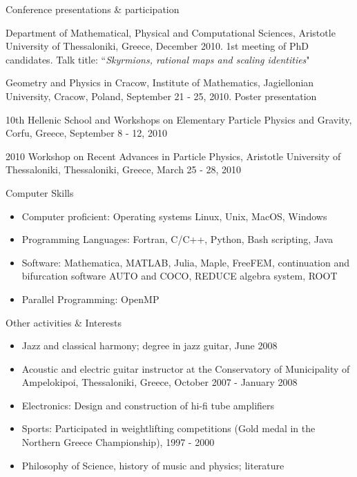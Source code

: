 \documentclass[10pt]{article} %
\newenvironment{outerlist}[1][\enskip\textbullet]%
        {\begin{itemize}[#1]}{\end{itemize}%
         \vspace{-.6\baselineskip}}
\begin{document}
\begin{section}{Conference presentations \& participation}
\begin{etaremune}
\item  Department of Mathematical, Physical and Computational Sciences, Aristotle University of Thessaloniki, Greece, December 2010.
       1st meeting of PhD candidates. Talk title: ``\textit{Skyrmions, rational maps and scaling identities}"
  
\item  Geometry and Physics in Cracow, Institute of Mathematics, Jagiellonian University, Cracow, Poland, 
       September 21 - 25, 2010. Poster presentation
        
\item   10th Hellenic  School and Workshops on Elementary Particle Physics and Gravity, Corfu, Greece, September 8 - 12, 2010                
        
\item   2010 Workshop on Recent Advances in Particle Physics, Aristotle University of Thessaloniki, Thessaloniki, 
        Greece, March 25 - 28, 2010  
  
\end{etaremune}

\end{section}

\begin{section}{Computer Skills}
\begin{outerlist}

\item \vskip -7mm
Computer proficient:  Operating systems Linux, Unix, MacOS, Windows
\item Programming Languages: Fortran, C/C++, Python, Bash scripting, Java
\item Software: Mathematica, MATLAB, Julia, Maple, FreeFEM, continuation and bifurcation
software AUTO and COCO, REDUCE algebra system, ROOT
\item Parallel Programming: OpenMP

\end{outerlist}

\end{section}

\begin{section}{Other activities \& Interests}
\begin{outerlist}

\item \vskip -7mm 
Jazz and classical harmony; degree in jazz guitar, June 2008
\item Acoustic and electric guitar instructor at the Conservatory 
of Municipality of Ampelokipoi, Thessaloniki, Greece, October 2007 - January 2008
\item Electronics: Design and construction of hi-fi tube amplifiers
\item Sports: Participated in weightlifting competitions (Gold medal in the 
Northern Greece Championship), 1997 - 2000
\item Philosophy of Science, history of music and physics; literature
\end{outerlist}

\end{section}
\end{document}
